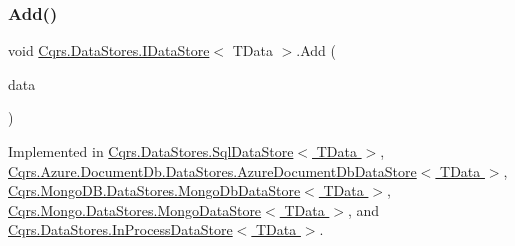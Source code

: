 \mbox{\label{interfaceCqrs_1_1DataStores_1_1IDataStore_a906f3f2f80db7a549a4170eca4653e26_a906f3f2f80db7a549a4170eca4653e26}} 
\subsubsection{\texorpdfstring{Add()}{Add()}\hspace{0.1cm}{\footnotesize\ttfamily [2/2]}}
{\footnotesize\ttfamily void \hyperlink{interfaceCqrs_1_1DataStores_1_1IDataStore}{Cqrs.\+Data\+Stores.\+I\+Data\+Store}$<$ T\+Data $>$.Add (\begin{DoxyParamCaption}\item[{I\+Enumerable$<$ T\+Data $>$}]{data }\end{DoxyParamCaption})}



Implemented in \hyperlink{classCqrs_1_1DataStores_1_1SqlDataStore_a45aa105f2571510223c6073804690487_a45aa105f2571510223c6073804690487}{Cqrs.\+Data\+Stores.\+Sql\+Data\+Store$<$ T\+Data $>$}, \hyperlink{classCqrs_1_1Azure_1_1DocumentDb_1_1DataStores_1_1AzureDocumentDbDataStore_a2d91050f17273687e44a121623803e7a_a2d91050f17273687e44a121623803e7a}{Cqrs.\+Azure.\+Document\+Db.\+Data\+Stores.\+Azure\+Document\+Db\+Data\+Store$<$ T\+Data $>$}, \hyperlink{classCqrs_1_1MongoDB_1_1DataStores_1_1MongoDbDataStore_a709fc1e29d266a7c19a46bd181d03963_a709fc1e29d266a7c19a46bd181d03963}{Cqrs.\+Mongo\+D\+B.\+Data\+Stores.\+Mongo\+Db\+Data\+Store$<$ T\+Data $>$}, \hyperlink{classCqrs_1_1Mongo_1_1DataStores_1_1MongoDataStore_a38c242b255dc17cf8d19470fdf5a99bf_a38c242b255dc17cf8d19470fdf5a99bf}{Cqrs.\+Mongo.\+Data\+Stores.\+Mongo\+Data\+Store$<$ T\+Data $>$}, and \hyperlink{classCqrs_1_1DataStores_1_1InProcessDataStore_ad62504e478f0a907c18ec4aa9b42703a_ad62504e478f0a907c18ec4aa9b42703a}{Cqrs.\+Data\+Stores.\+In\+Process\+Data\+Store$<$ T\+Data $>$}.

\mbox{\label{interfaceCqrs_1_1DataStores_1_1IDataStore_aa7ade96f2f3151d5353cf7bdbb2baec5_aa7ade96f2f3151d5353cf7bdbb2baec5}} 

